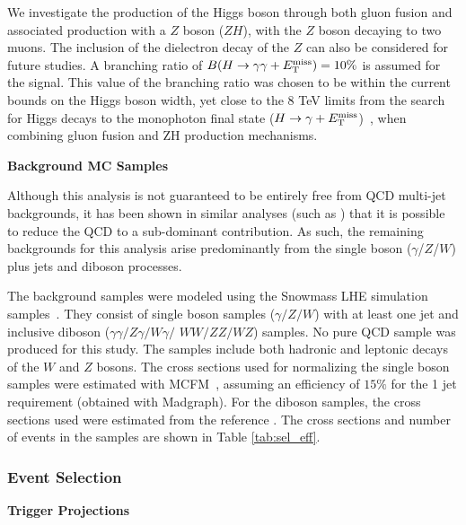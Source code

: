 We investigate the production of the Higgs boson through both gluon fusion and associated production with a $Z$ boson ($ZH$), with the $Z$ boson decaying to two muons. The inclusion of the dielectron decay of the $Z$ can also be considered for future studies.
%
A branching ratio of ${B}(H\to\gamma\gamma+E_{\mathrm{T}}^{\text{miss}}) = 10\%$ is assumed for the signal. This value of the branching ratio was chosen to be within the current bounds on the Higgs boson width, yet close to the 8 TeV limits from the search for Higgs decays to the monophoton final state ($H\to\gamma+E_{\mathrm{T}}^{\text{miss}}$)~\cite{lowmonophoton}, when combining gluon fusion and ZH production mechanisms.


\vspace{0.2cm} \textbf{Background MC Samples}

Although this analysis is not guaranteed to be entirely free from QCD multi-jet backgrounds, it has been shown in similar analyses (such as \cite{lowmonophoton}) that it is possible to reduce the QCD to a sub-dominant contribution. As such, the remaining backgrounds for this analysis arise predominantly from the single boson ($\gamma$/$Z$/$W$) plus jets and diboson processes.

The background samples were modeled using the Snowmass LHE simulation samples~\cite{Anderson:2013kxz}. They consist of single boson samples ($\gamma/Z/W$) with at least one jet and inclusive diboson ($\gamma\gamma/Z\gamma/W\gamma/$ $WW/ZZ/WZ$) samples. No pure QCD sample was produced for this study. The samples include both hadronic and leptonic decays of the $W$ and $Z$ bosons. The cross sections used for normalizing the single boson samples were estimated with MCFM~\cite{MCFM}, assuming an efficiency of $15\%$ for the 1 jet requirement (obtained with Madgraph). For the diboson samples, the cross sections used were estimated from the reference \cite{Campbell:2011bn}. The cross sections and number of events in the samples are shown in Table \ref{tab:sel_eff}.


\subsubsection{Event Selection}

\vspace{0.2cm} \textbf{Trigger Projections}

